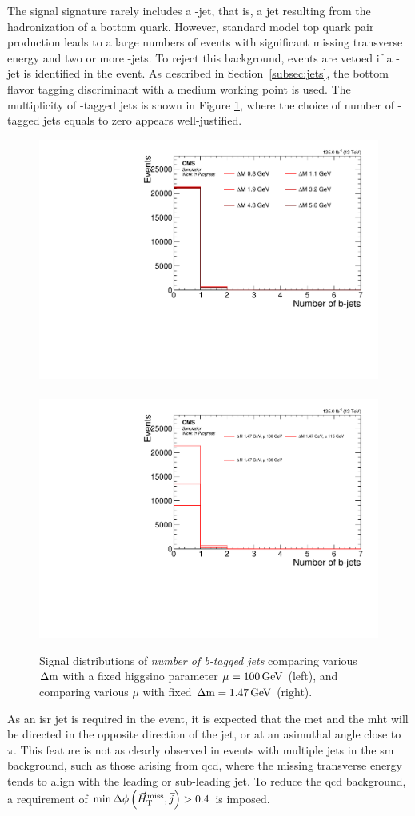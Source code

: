 The signal signature rarely includes a \PQb-jet, that is, a jet resulting from the hadronization of a bottom quark. However, standard model top quark pair production leads to a large numbers of events with significant missing transverse energy and two or more \PQb-jets. To reject this background, events are vetoed if a \PQb-jet is identified in the event. As described in Section~\ref{subsec:jets}, the \DEEPCSV bottom flavor tagging discriminant with a medium working point is used. The multiplicity of \PQb-tagged jets is shown in Figure \ref{fig:signal-bjets}, where the choice of number of \PQb-tagged jets equals to zero appears well-justified. 

\begin{figure}[!htb]
\centering
\includegraphics[width=0.48\linewidth]{plots/signal_common_distributions_fixed_mu/none_BTagsDeepMedium.pdf} \,
\includegraphics[width=0.48\linewidth]{plots/signal_common_distributions_fixed_dm/none_BTagsDeepMedium.pdf}  \\
\caption[Signal \emph{number of b-tagged jets} distributions]{ Signal distributions of \emph{number of b-tagged jets} comparing various $\Delta\mathrm{m}$ with a fixed higgsino parameter $\mu=100\,\text{Ge\hspace{-.08em}V}$ (left), and comparing various $\mu$ with fixed $\Delta\mathrm{m}=1.47\,\text{Ge\hspace{-.08em}V}$ (right).}
\label{fig:signal-bjets}
\end{figure}

As an \gls{isr} jet is required in the event, it is expected that the \gls{met} and the \gls{mht} will be directed in the opposite direction of the jet, or at an asimuthal angle close to $\pi$. This feature is not as clearly observed in events with multiple jets in the \gls{sm} background, such as those arising from \gls{qcd}, where the missing transverse energy tends to align with the leading or sub-leading jet. To reduce the \gls{qcd} background, a requirement of $\min{\Delta\phi\left(\ensuremath{\vec{H}_{\text{T}}^{\text{miss}}},\vec{j}\right)} > 0.4$ is imposed.

